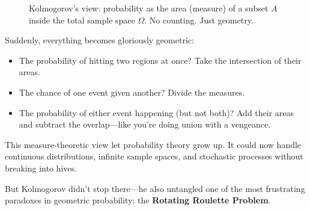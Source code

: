 \begin{figure}[H]
\centering
{}
\caption{Kolmogorov’s view: probability as the area (measure) of a subset \( A \) inside the total sample space \( \Omega \). No counting. Just geometry.}
\end{figure}


Suddenly, everything becomes gloriously geometric:
\begin{itemize}
    \item The probability of hitting two regions at once? Take the intersection of their areas.
    \item The chance of one event given another? Divide the measures.
    \item The probability of either event happening (but not both)? Add their areas and subtract the overlap—like you’re doing union with a vengeance.
\end{itemize}

This measure-theoretic view let probability theory grow up. It could now handle continuous distributions, infinite sample spaces, and stochastic processes without breaking into hives.


But Kolmogorov didn’t stop there—he also untangled one of the most frustrating paradoxes in geometric probability: the \textbf{Rotating Roulette Problem}.

